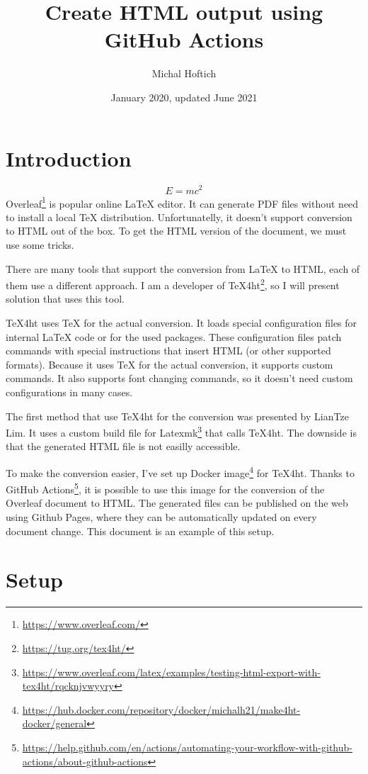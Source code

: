 \documentclass{article}
\title{Create HTML output using GitHub Actions}
\author{Michal Hoftich}
\date{January 2020, updated June 2021}
\newcommand\footurl[1]{\footnote{\url{#1}}}
\newcommand\urllink[2]{#1\footurl{#2}}
\begin{document}
\maketitle

\section{Introduction}

\begin{equation}
E = mc^2
\end{equation}
\urllink{Overleaf}{https://www.overleaf.com/} is popular online \LaTeX{}
editor. It can generate PDF files 
without need to install a local \TeX{} distribution. Unfortunatelly, it doesn't
support conversion to HTML out of the box. To get the HTML version of the
document, we must use some tricks.

There are many tools that support the conversion from \LaTeX{} to HTML, each of
them use a different approach. I am a developer of
\urllink{\TeX4ht}{https://tug.org/tex4ht/}, so I will present solution that
uses this tool. 

\TeX4ht uses \TeX{} for the actual conversion. It loads special configuration
files for internal \LaTeX{} code or for the used packages. These configuration
files patch commands with special instructions that insert HTML (or other
supported formats). Because it uses \TeX{} for the actual conversion, it
supports custom commands. It also supports font changing commands, so  it
doesn't need custom configurations in many cases.

The first method that use \TeX4ht for the conversion was presented by LianTze
Lim. It uses a custom build file for
\urllink{Latexmk}{https://www.overleaf.com/latex/examples/testing-html-export-with-tex4ht/rqcknjvwyyry} 
that calls \TeX4ht. The downside is that the generated HTML file is not easilly accessible.  

To make the conversion easier, I've set up \urllink{Docker image}{https://hub.docker.com/repository/docker/michalh21/make4ht-docker/general} for \TeX4ht. 
Thanks to \urllink{GitHub Actions}{https://help.github.com/en/actions/automating-your-workflow-with-github-actions/about-github-actions}, 
it is possible to use this image for the conversion of the Overleaf document to HTML. 
The generated files can be published on the web using Github Pages, where they can be automatically 
updated on every document change. This document is an example of this setup.

\section{Setup}
\end{document}
